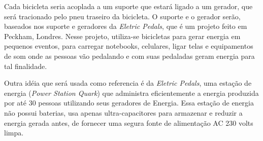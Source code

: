 	Cada bicicleta seria acoplada a um suporte que estará ligado a um gerador, que será tracionado pelo pneu traseiro da bicicleta. O suporte e o gerador serão, baseados nos suporte e geradores da \textit{Eletric Pedals}, que é um projeto feito em Peckham, Londres. Nesse projeto, utiliza-se bicicletas para gerar energia em pequenos eventos, para carregar notebooks, celulares, ligar telas e equipamentos de som onde as pessoas vão pedalando e com suas pedaladas geram energia para tal finalidade.
	
	Outra idéia que será usada como referencia é da \textit{Eletric Pedals}, uma estação de energia (\textit{Power Station Quark}) que administra eficientemente a energia produzida por até 30 pessoas utilizando seus geradores de Energia. Essa estação de energia não possui baterias, usa apenas ultra-capacitores para armazenar e reduzir a energia gerada antes, de fornecer uma segura fonte de alimentação AC 230 volts limpa.

